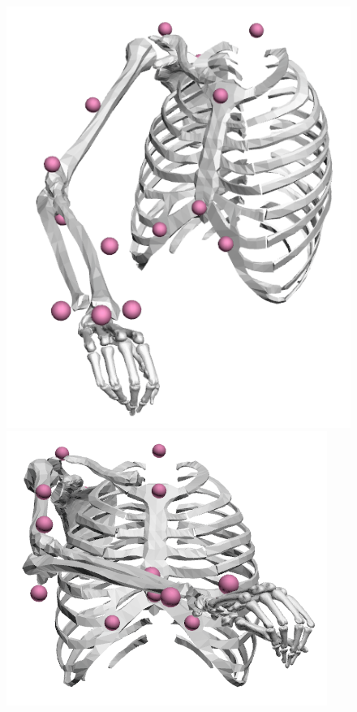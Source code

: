 \begin{figure}[!htb]
    \centering
    \captionsetup{justification=centering}
    \begin{minipage}{0.3\linewidth}
        \centering
        \includegraphics[trim={0 0 0 0}, clip, width=0.7\linewidth]{img/chapter_5/posture4_3D.png}
    \end{minipage}
    \hfill
    \begin{minipage}{0.3\linewidth}
        \captionsetup{justification=centering}
        \centering
        \includegraphics[trim={0 0 0 0}, clip, width=0.65\linewidth]{img/chapter_5/posture4_coronal.png}
    \end{minipage}
    \hfill
    \begin{minipage}{0.3\linewidth}
        \captionsetup{justification=centering}
        \centering

\end{minipage}
\end{figure}
